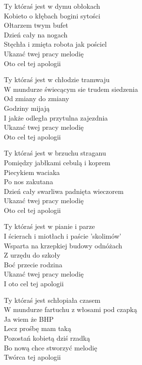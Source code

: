 
\begin{text}
    Ty któraś jest w dymu obłokach\\
    Kobieto o kłębach bogini sytości\\
    Ołtarzem twym bufet\\
    Dzień cały na nogach\\
    Stęchła i zmięta robota jak pościel\\
    Ukazać twej pracy melodię\\
    Oto cel tej apologii

    Ty któraś jest w chłodzie tramwaju\\
    W mundurze świecącym sie trudem siedzenia\\
    Od zmiany do zmiany\\
    Godziny mijają\\
    I jakże odległa przytulna zajezdnia\\
    Ukazać twej pracy melodię\\
    Oto cel tej apologii

    Ty któraś jest w brzuchu straganu\\
    Pomiędzy jabłkami cebulą i koprem\\
    Piecykiem waciaka\\
    Po nos zakutana\\
    Dzień cały swarliwa padnięta wieczorem\\
    Ukazać twej pracy melodię\\
    Oto cel tej apologii

    Ty któraś jest w pianie i parze\\
    I ścierach i miotłach i paście 'skolimów'\\
    Wsparta na krzepkiej budowy odnóżach\\
    Z urzędu do szkoły\\
    Boć przecie rodzina\\
    Ukazać twej pracy melodię\\
    I oto cel tej apologii

    Ty któraś jest schłopiała czasem\\
    W mundurze fartuchu z włosami pod czapką\\
    Ja wiem że BHP\\
    Lecz prośbę mam taką\\
    Pozostań kobietą dziś rzadką\\
    Bo nową chce stworzyć melodię\\
    Twórca tej apologii
\end{text}
\begin{chord}

\end{chord}